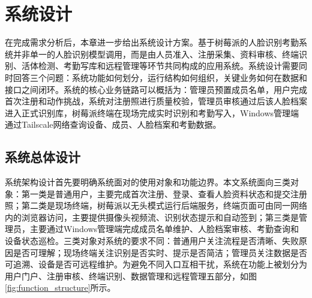 \chapter{系统设计}

在完成需求分析后，本章进一步给出系统设计方案。基于树莓派的人脸识别考勤系统并非单一的人脸识别模型调用，而是由人员准入、注册采集、资料审核、终端识别、活体检测、考勤写库和远程管理等环节共同构成的应用系统。系统设计需要同时回答三个问题：系统功能如何划分，运行结构如何组织，关键业务如何在数据和接口之间闭环。系统的核心业务链路可以概括为：管理员预置成员名单，用户完成首次注册和动作挑战，系统对注册照进行质量校验，管理员审核通过后该人脸档案进入正式识别库，树莓派终端在现场完成实时识别和考勤写入，Windows管理端通过Tailscale网络查询设备、成员、人脸档案和考勤数据。

\section{系统总体设计}

系统架构设计首先要明确系统面对的使用对象和功能边界。本文系统面向三类对象：第一类是普通用户，主要完成首次注册、登录、查看人脸资料状态和提交注册照；第二类是现场终端，树莓派以无头模式运行后端服务，终端页面可由同一网络内的浏览器访问，主要提供摄像头视频流、识别状态提示和自动签到；第三类是管理员，主要通过Windows管理端完成成员名单维护、人脸档案审核、考勤查询和设备状态巡检。三类对象对系统的要求不同：普通用户关注流程是否清晰、失败原因是否可理解；现场终端关注识别是否实时、提示是否简洁；管理员关注数据是否可追溯、设备是否可远程维护。为避免不同入口互相干扰，系统在功能上被划分为用户门户、注册审核、终端识别、数据管理和远程管理五部分，如图\ref{fig:function_structure}所示。

